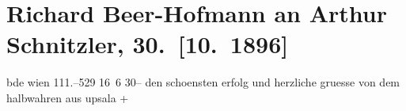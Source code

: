 

         \renewcommand{\erwaehnteOrte}{Orte: Berlin, Uppsala, Wien}
         \renewcommand{\erwaehnteWerke}{Werke: Freiwild. Schauspiel in 3 Akten}
               \section[Richard Beer-Hofmann an Arthur Schnitzler, 30. {[}10. 1896{]}]{ Richard Beer-Hofmann an Arthur Schnitzler, 30. {[}10. 1896{]}}\nopagebreak{}\rehead{ }\begin{ledgroupsized}[t]{13cm}\normalsize\beginnumbering \toendnotes[C]{\smallbreak\pagebreak[2]} 
\toendnotes[C]{\smallbreak}\pstart
           \noindent{}{\pb}bde{ }wien 111.–529 16 6{ }30–\pend
           \pstart
           den schoensten erfolg und herzliche gruesse von
               dem halbwahren aus upsala +\pend
           
         
         \endnumbering{}\end{ledgroupsized}  \newcommand{\dateiname}{L00613}\newcommand{\titel}{Richard Beer-Hofmann an Arthur Schnitzler, 30. [10. 1896]}\newcommand{\editorInnen}{Martin Anton Müller und Gerd-Hermann Susen}
      